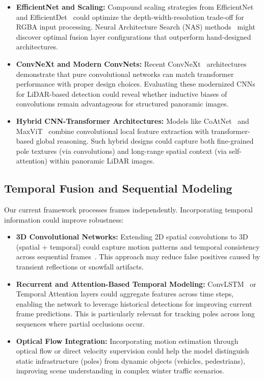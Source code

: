 \documentclass[runningheads]{llncs}
\begin{document}
\begin{itemize}
    \item \textbf{EfficientNet and Scaling:} Compound scaling strategies from EfficientNet~\cite{tan2019efficientnet} and EfficientDet~\cite{tan2020efficientdet} could optimize the depth-width-resolution trade-off for RGBA input processing. Neural Architecture Search (NAS) methods~\cite{tan2019mnasnet} might discover optimal fusion layer configurations that outperform hand-designed architectures.
    
    \item \textbf{ConvNeXt and Modern ConvNets:} Recent ConvNeXt~\cite{liu2022convnet} architectures demonstrate that pure convolutional networks can match transformer performance with proper design choices. Evaluating these modernized CNNs for LiDAR-based detection could reveal whether inductive biases of convolutions remain advantageous for structured panoramic images.
    
    \item \textbf{Hybrid CNN-Transformer Architectures:} Models like CoAtNet~\cite{dai2021coatnet} and MaxViT~\cite{tu2022maxvit} combine convolutional local feature extraction with transformer-based global reasoning. Such hybrid designs could capture both fine-grained pole textures (via convolutions) and long-range spatial context (via self-attention) within panoramic LiDAR images.
\end{itemize}

\subsection{Temporal Fusion and Sequential Modeling}

Our current framework processes frames independently. Incorporating temporal information could improve robustness:

\begin{itemize}
    \item \textbf{3D Convolutional Networks:} Extending 2D spatial convolutions to 3D (spatial + temporal) could capture motion patterns and temporal consistency across sequential frames~\cite{tran2015learning}. This approach may reduce false positives caused by transient reflections or snowfall artifacts.
    
    \item \textbf{Recurrent and Attention-Based Temporal Modeling:} ConvLSTM~\cite{shi2015convolutional} or Temporal Attention layers could aggregate features across time steps, enabling the network to leverage historical detections for improving current frame predictions. This is particularly relevant for tracking poles across long sequences where partial occlusions occur.
    
    \item \textbf{Optical Flow Integration:} Incorporating motion estimation through optical flow or direct velocity supervision could help the model distinguish static infrastructure (poles) from dynamic objects (vehicles, pedestrians), improving scene understanding in complex winter traffic scenarios.
\end{itemize}
\end{document}

